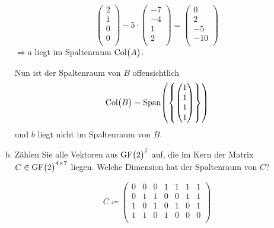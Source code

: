 \documentclass{scrreprt}
\begin{document}
\begin{enumerate}[(a)]
\[\begin{pmatrix}
      2 \\
      1 \\
      0 \\
      0 \\
    \end{pmatrix} - 5 \cdot \begin{pmatrix}
      -7 \\
      -4 \\
      1  \\
      2  \\
    \end{pmatrix} = \begin{pmatrix}
      0   \\
      2   \\
      -5  \\
      -10 \\
    \end{pmatrix}
  \]
  $\Rightarrow a$ liegt im Spaltenraum $\text{Col}\qty\big(A)$.

  Nun ist der Spaltenraum von $B$ offensichtlich
  \[
    \text{Col}\qty\big(B) = \text{Span}\qty(\qty{
      \begin{pmatrix} 1 \\ 1 \\ 1 \\ 1 \end{pmatrix}
    })
  \]
  und $b$ liegt nicht im Spaltenraum von $B$.

\item Zählen Sie alle Vektoren aus $\text{GF}\qty\big(2)^7$ auf, die im Kern der
  Matrix $C \in \text{GF}\qty\big(2)^{4 \times 7}$ liegen.
  Welche Dimension hat der Spaltenraum von $C$?

  \[
    C \coloneqq \begin{pmatrix}
      0 & 0 & 0 & 1 & 1 & 1 & 1 \\
      0 & 1 & 1 & 0 & 0 & 1 & 1 \\
      1 & 0 & 1 & 0 & 1 & 0 & 1 \\
      1 & 1 & 0 & 1 & 0 & 0 & 0 \\
    \end{pmatrix}
  \]


\end{enumerate}
\end{document}
